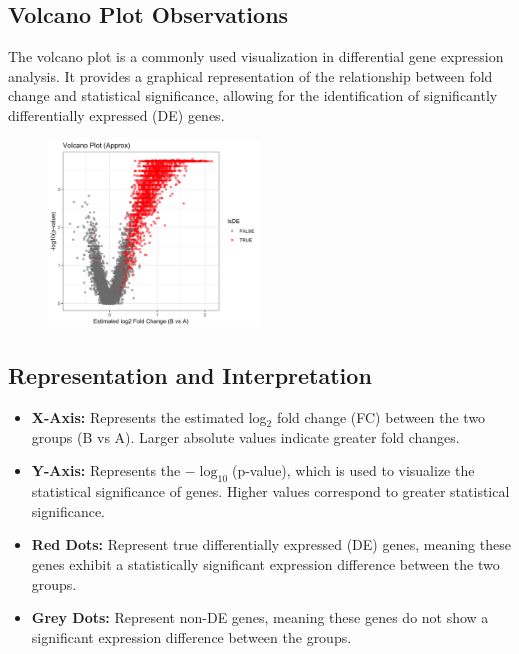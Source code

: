 \documentclass[12pt]{article}
\begin{document}
\subsection{Volcano Plot Observations}
The volcano plot is a commonly used visualization in differential gene expression analysis. It provides a graphical representation of the relationship between fold change and statistical significance, allowing for the identification of significantly differentially expressed (DE) genes.

\begin{figure}[h]
  \centering
  \includegraphics[width=0.5\textwidth]{figure/volcanoplot.png}  %
\end{figure}

\subsection*{Representation and Interpretation}
\begin{itemize}
    \item \textbf{X-Axis:} Represents the estimated log$_2$ fold change (FC) between the two groups (B vs A). Larger absolute values indicate greater fold changes.
    \item \textbf{Y-Axis:} Represents the $-\log_{10}$(p-value), which is used to visualize the statistical significance of genes. Higher values correspond to greater statistical significance.
    \item \textbf{Red Dots:} Represent true differentially expressed (DE) genes, meaning these genes exhibit a statistically significant expression difference between the two groups.
    \item \textbf{Grey Dots:} Represent non-DE genes, meaning these genes do not show a significant expression difference between the groups.
\end{itemize}
\end{document}
